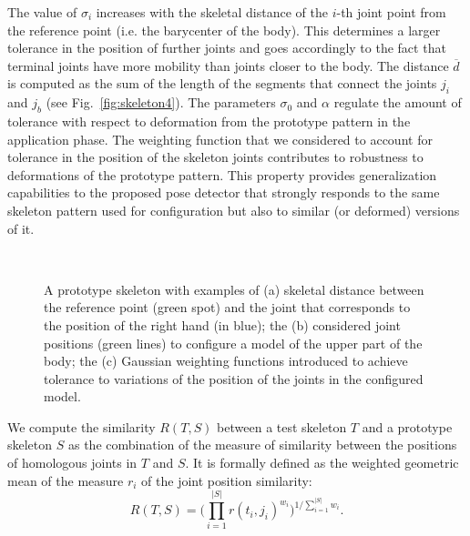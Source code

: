 \documentclass[runningheads,a4paper]{llncs}
\begin{document}
The value of $\sigma_i$ increases with the skeletal distance of the $i$-th joint point from the reference point (i.e. the barycenter of the body). This determines a larger tolerance in the position of further joints and goes accordingly to the fact that terminal joints have more mobility than joints closer to the body.
The distance $\overline{d}$ is computed as the sum of the length of the segments that connect the joints $j_i$ and $j_b$ (see Fig.~\ref{fig:skeleton4}).
The parameters $\sigma_{0}$ and $\alpha$ regulate the amount of tolerance with respect to deformation from the prototype pattern in the application phase. %
The weighting function that we considered to account for tolerance in the position of the skeleton joints contributes to robustness to deformations of the prototype pattern. This property provides generalization capabilities to the proposed pose detector that  strongly responds to the same skeleton pattern used for configuration but also to similar (or deformed) versions of it.

\begin{figure}[!t]
   \centering
    \setlength{\unitlength}{50mm}%
 ~
  ~
 ~
   \caption{A prototype skeleton with examples of (a) skeletal distance between the reference point (green spot) and the joint that corresponds to the position of the right hand (in blue); the (b) considered joint positions (green lines) to configure a model of the upper part of the body; the (c) Gaussian weighting functions introduced to achieve tolerance to variations of the position of the joints in the configured model.}
   \label{fig:filter}
\end{figure}


We compute the similarity $R(T, S)$ between a test skeleton $T$ and a prototype skeleton $S$ as the combination of the measure of similarity between the positions of homologous joints in $T$ and $S$.
It is formally defined as the weighted geometric mean of the measure $r_i$ of the joint position similarity:
\begin{equation}
 R(T,S) = \bigg(\prod_{i=1}^{|S|} r(t_i,j_i)^{w_i}\bigg)^{1/\sum_{i=1}^{|S|}w_i}.
\end{equation}
\end{document}
